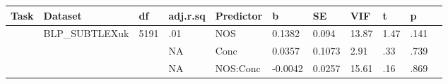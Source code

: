 \begin{table}[ht]
\centering
\begingroup\normalsize
\begin{tabular}{lllllllllll}
  \hline
Task & Dataset & df & adj.r.sq & Predictor & b & SE & VIF & t & p &  \\ 
  \hline
 & BLP\_SUBTLEXuk & 5191 & .01 & NOS & 0.1382 & 0.094 & 13.87 & 1.47 & .141 &   \\ 
   &  &  & NA & Conc & 0.0357 & 0.1073 & 2.91 & .33 & .739 &   \\ 
   &  &  & NA & NOS:Conc & -0.0042 & 0.0257 & 15.61 & .16 & .869 &   \\ 
   \hline
\end{tabular}
\endgroup
\end{table}

